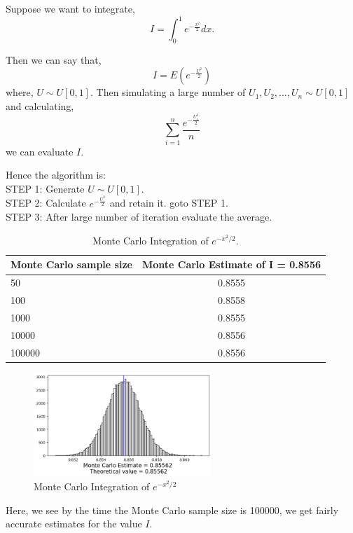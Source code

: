 \begin{example}
	Suppose we want to integrate,
	\[
		I = \int_{0}^{1} e^{-\frac{x ^{2}}{2}} dx.
	\]

	Then we can say that,
	\[
		I = E(e^{-\frac{U ^{2}}{2}})
	\]
	where, $U\sim U[0,1]$. Then simulating a large number of $U_1, U_2, \ldots, U_n\sim U[0,1]$ and calculating,
	\[
		\sum_{i = 1}^{n}  \frac{e^{-\frac{U_i ^{2}}{2}}}{n}
	\]
	we can evaluate $I$.

	Hence the algorithm is:\\
	STEP 1: Generate $U\sim U[0,1]$. \\
	STEP 2: Calculate $ e^{-\frac{U ^{2}}{2}} $ and retain it. goto STEP 1. \\
	STEP 3: After large number of iteration evaluate the average.
	\begin{table}[H]
		\begin{center}
			\begin{tabular}{l c}
				\hline
				Monte Carlo sample size & Monte Carlo Estimate of I = 0.8556 \\
				\hline
				50                      & 0.8555                              \\
				100                     & 0.8558                              \\
				1000                    & 0.8555                              \\
				10000                   & 0.8556                              \\
				100000                  & 0.8556                              \\
				\hline
			\end{tabular}
			\caption{Monte Carlo Integration of $e^{-x ^{2}/2}$.}
		\end{center}
	\end{table}
	\begin{figure}[H]
		\centering
		\includegraphics[width=0.6\textwidth]{images/evaluating_integration.png}
		\caption{Monte Carlo Integration of $e^{-x ^{2}/2} $}
	\end{figure}
	Here, we see by the time the Monte Carlo sample size is 100000, we get fairly
	accurate estimates for the value $I$.
\end{example}

